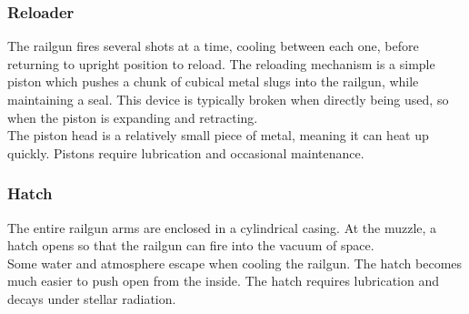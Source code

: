 \documentclass[a4paper]{article}
\begin{document}
\vspace{-0.5cm} \hspace{-18pt} \subsubsection{Reloader} \label{railgun_reloader} \vspace{-0.2cm}
The railgun fires several shots at a time, cooling between each one, before returning to upright position to reload. The reloading mechanism is a simple piston which pushes a chunk of cubical metal slugs into the railgun, while maintaining a seal. This device is typically broken when directly being used, so when the piston is expanding and retracting.
\\ \pbhw
{}
{}
{The piston head is a relatively small piece of metal, meaning it can heat up quickly.}
{Pistons require lubrication and occasional maintenance.}


\vspace{-0.5cm} \hspace{-18pt} \subsubsection{Hatch} \label{railgun_hatch} \vspace{-0.2cm}
The entire railgun arms are enclosed in a cylindrical casing. At the muzzle, a hatch opens so that the railgun can fire into the vacuum of space. 
\\ \pbhw
{Some water and atmosphere escape when cooling the railgun.}
{}
{The hatch becomes much easier to push open from the inside.}
{The hatch requires lubrication and decays under stellar radiation.}
\end{document}

